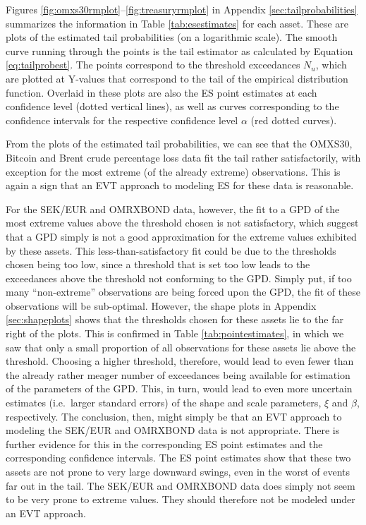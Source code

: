 \documentclass[a4paper,11pt]{article}
\theoremstyle{definition}
\theoremstyle{definition}
\theoremstyle{definition}
\theoremstyle{definition}
\theoremstyle{remark}
\begin{document}
Figures \ref{fig:omxs30rmplot}--\ref{fig:treasuryrmplot} in Appendix \ref{sec:tailprobabilities} summarizes the information in Table \ref{tab:esestimates} for each asset. These are plots of the estimated tail probabilities (on a logarithmic scale). The smooth curve running through the points is the tail estimator as calculated by Equation \eqref{eq:tailprobest}. The points correspond to the threshold exceedances \(N_u\), which are plotted at Y-values that correspond to the tail of the empirical distribution function. Overlaid in these plots are also the ES point estimates at each confidence level (dotted vertical lines), as well as curves corresponding to the confidence intervals for the respective confidence level \(\alpha\) (red dotted curves).

From the plots of the estimated tail probabilities, we can see that the OMXS30, Bitcoin and Brent crude percentage loss data fit the tail rather satisfactorily, with exception for the most extreme (of the already extreme) observations. This is again a sign that an EVT approach to modeling ES for these data is reasonable.

For the SEK/EUR and OMRXBOND data, however, the fit to a GPD of the most extreme values above the threshold chosen is not satisfactory, which suggest that a GPD simply is not a good approximation for the extreme values exhibited by these assets. This less-than-satisfactory fit could be due to the thresholds chosen being too low, since a threshold that is set too low leads to the exceedances above the threshold not conforming to the GPD. Simply put, if too many ``non-extreme'' observations are being forced upon the GPD, the fit of these observations will be sub-optimal. However, the shape plots in Appendix \ref{sec:shapeplots} shows that the thresholds chosen for these assets lie to the far right of the plots. This is confirmed in Table \ref{tab:pointestimates}, in which we saw that only a small proportion of all observations for these assets lie above the threshold. Choosing a higher threshold, therefore, would lead to even fewer than the already rather meager number of exceedances being available for estimation of the parameters of the GPD. This, in turn, would lead to even more uncertain estimates (i.e.~larger standard errors) of the shape and scale parameters, \(\xi\) and \(\beta\), respectively. The conclusion, then, might simply be that an EVT approach to modeling the SEK/EUR and OMRXBOND data is not appropriate. There is further evidence for this in the corresponding ES point estimates and the corresponding confidence intervals. The ES point estimates show that these two assets are not prone to very large downward swings, even in the worst of events far out in the tail. The SEK/EUR and OMRXBOND data does simply not seem to be very prone to extreme values. They should therefore not be modeled under an EVT approach.
\end{document}
